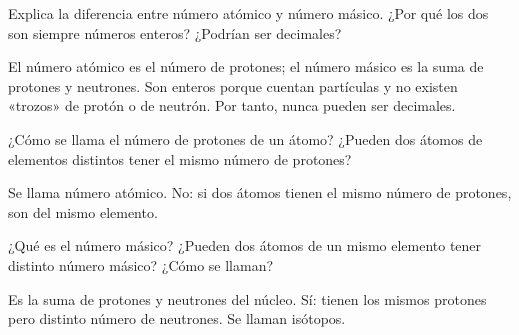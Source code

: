 \begin{exercise}
    Explica la diferencia entre número atómico y número másico. ¿Por qué los dos son siempre números enteros? ¿Podrían ser decimales?
    \begin{solu}
        El número atómico es el número de protones; el número másico es la suma de protones y neutrones. Son enteros porque cuentan partículas y no existen «trozos» de protón o de neutrón. Por tanto, nunca pueden ser decimales.
    \end{solu}
\end{exercise}

\begin{exercise}
    ¿Cómo se llama el número de protones de un átomo? ¿Pueden dos átomos de elementos distintos tener el mismo número de protones?
    \begin{solu}
        Se llama número atómico. No: si dos átomos tienen el mismo número de protones, son del mismo elemento.
    \end{solu}
\end{exercise}

\begin{exercise}
    ¿Qué es el número másico? ¿Pueden dos átomos de un mismo elemento tener distinto número másico? ¿Cómo se llaman?
    \begin{solu}
        Es la suma de protones y neutrones del núcleo. Sí: tienen los mismos protones pero distinto número de neutrones. Se llaman isótopos.
    \end{solu}
\end{exercise}

